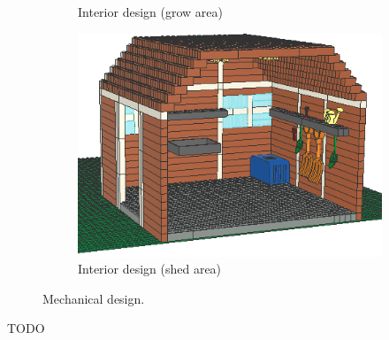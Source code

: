 \documentclass{PDS}
\begin{document}
\begin{figure}[htbp]
\begin{subfigure}[b]{0.3\textwidth}
        \caption{Interior design (grow area)}
        \label{fig:glasshouse_2}
    \end{subfigure}
    \hfill
    \begin{subfigure}[b]{0.3\textwidth}
        \centering
        \includegraphics[width=\textwidth]{./figures/glasshouse_3.png}
        \caption{Interior design (shed area)}
        \label{fig:glasshouse_3}
    \end{subfigure}
    \caption{Mechanical design.}
    \label{fig:glasshouse}
\end{figure}

TODO
\end{document}
